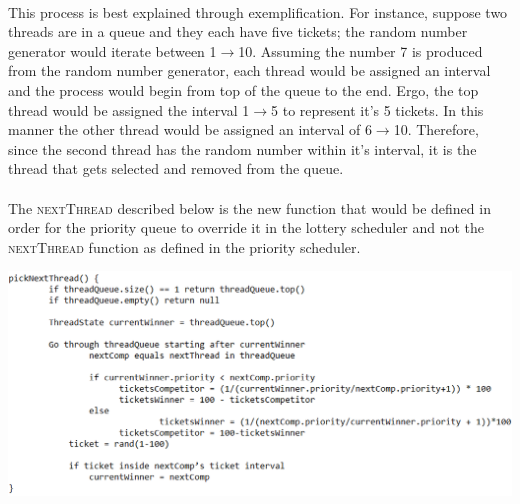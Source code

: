 \documentclass[12pt]{article}
\begin{document}
{\paragraph{}This process is best explained through exemplification. For instance, suppose two threads are in a queue and they each have five tickets; 
  the random number generator would iterate between 1$\longrightarrow$10. Assuming the number 7 is produced from the random number generator,
  each thread would be assigned an interval and the process would begin from top of the queue to the end. Ergo, the top thread would be assigned 
  the interval 1$\longrightarrow$5 to represent it's 5 tickets. In this manner the other thread would be assigned an interval of 
  6$\longrightarrow$10. Therefore, since the second thread has the random number within it's interval, it is the thread that gets selected and 
  removed from the queue. \\\\
The \textsc{nextThread} described below is the new function that would be defined in order for the priority queue to override it in the lottery scheduler and not the \textsc{nextThread} function as defined in the priority scheduler.
\begin{center}\includegraphics[width=140mm]{pic4_4.png}\end{center}
}
\end{document}
